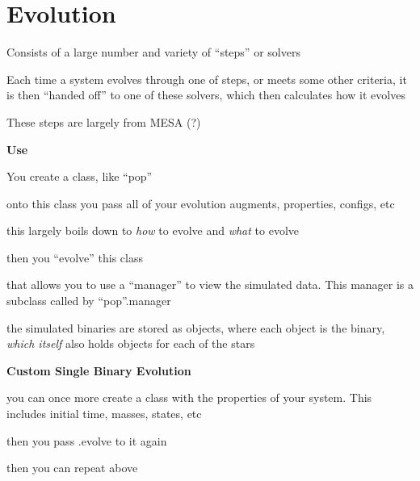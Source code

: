 \documentclass{article}
\author{Pierson Lipschultz}
\begin{document}
\section{Evolution}

\begin{list}{-}{}
\item Consists of a large number and variety of ``steps'' or solvers
\item Each time a system evolves through one of steps, or meets some other criteria, it is then ``handed off'' to one of these solvers, which then calculates how it evolves 
\item These steps are largely from MESA (?)
\item 
\end{list}


\noindent \textbf{\large Use}
\begin{list}{-}{}
\item You create a class, like ``pop''
\item onto this class you pass all of your evolution augments, properties, configs, etc
\item this largely boils down to \textit{how} to evolve and \textit{what} to evolve
\item then you ``evolve'' this class 
\item that allows you to use a ``manager'' to view the simulated data. This manager is a subclass called by ``pop''.manager
\item the simulated binaries are stored as objects, where each object is the binary, \textit{which itself} also holds objects for each of the stars 
\end{list}

\noindent \textbf{\large Custom Single Binary Evolution}
\begin{list}{-}{}
\item you can once more create a class with the properties of your system. This includes initial time, masses, states, etc
\item then you pass .evolve to it again
\item then you can repeat above
\end{list}
\printglossaries
\end{document}
